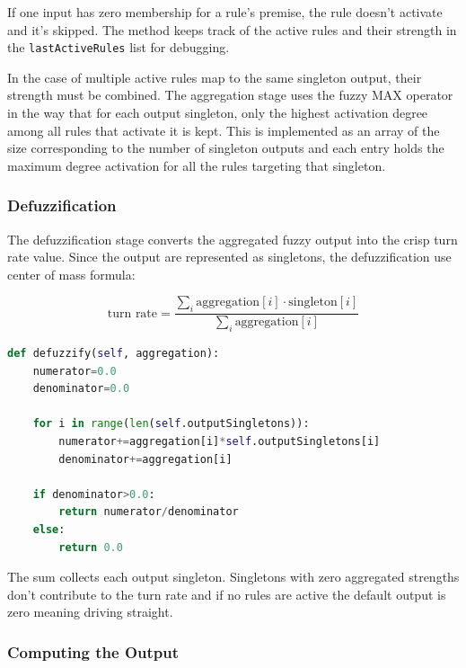 If one input has zero membership for a rule’s premise, the rule doesn’t activate and it’s skipped. The method keeps track of the active rules and their strength in the \texttt{lastActiveRules} list for debugging.

In the case of multiple active rules map to the same singleton output, their strength must be combined. The aggregation stage uses the fuzzy MAX operator in the way that for each output singleton, only the highest activation degree among all rules that activate it is kept. This is implemented as an array of the size corresponding to the number of singleton outputs and each entry holds the maximum degree activation for all the rules targeting that singleton.

\subsubsection{Defuzzification}

The defuzzification stage converts the aggregated fuzzy output into the crisp turn rate value. Since the output are represented as singletons, the defuzzification use center of mass formula:

\begin{equation}
    \text{turn rate} = \frac{\sum_i \text{aggregation}[i] \cdot \text{singleton}[i]}{\sum_i \text{aggregation}[i]}
    \label{eq:defuzz}
\end{equation}

\begin{lstlisting}[language=Python, caption={FuzzyRuleBasedAlgorithm defuzzification}, label={lst:lk-init}]
def defuzzify(self, aggregation):
    numerator=0.0
    denominator=0.0
    
    for i in range(len(self.outputSingletons)):
        numerator+=aggregation[i]*self.outputSingletons[i]
        denominator+=aggregation[i]
        
    if denominator>0.0:
        return numerator/denominator
    else:
        return 0.0
\end{lstlisting}

The sum collects each output singleton. Singletons with zero aggregated strengths don’t contribute to the turn rate and if no rules are active the default output is zero meaning driving straight.

\subsubsection{Computing the Output}


